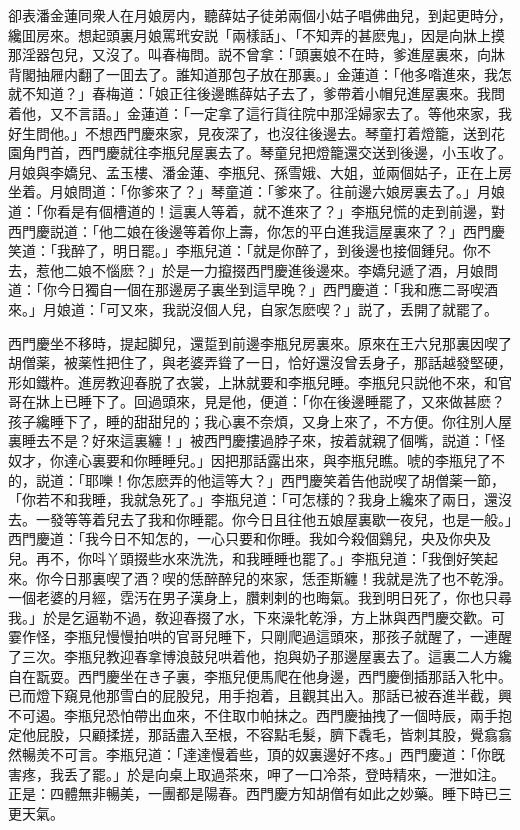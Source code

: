 卻表潘金蓮同衆人在月娘房内，聽薛姑子徒弟兩個小姑子唱佛曲兒，到起更時分，纔囬房來。想起頭裏月娘罵玳安説「兩樣話」、「不知弄的甚麽鬼」，因是向牀上摸那淫器包兒，又沒了。叫春梅問。説不曾拿：「頭裏娘不在時，爹進屋裏來，向牀背閣抽屜内翻了一囬去了。誰知道那包子放在那裏。」金蓮道：「他多喒進來，我怎就不知道？」春梅道：「娘正往後邊瞧薛姑子去了，爹帶着小帽兒進屋裏來。我問着他，又不言語。」金蓮道：「一定拿了這行貨往院中那淫婦家去了。等他來家，我好生問他。」不想西門慶來家，見夜深了，也沒往後邊去。琴童打着燈籠，送到花園角門首，西門慶就往李瓶兒屋裏去了。琴童兒把燈籠還交送到後邊，小玉收了。月娘與李嬌兒、孟玉樓、潘金蓮、李瓶兒、孫雪娥、大姐，並兩個姑子，正在上房坐着。月娘問道：「你爹來了？」琴童道：「爹來了。往前邊六娘房裏去了。」月娘道：「你看是有個槽道的！這裏人等着，就不進來了？」李瓶兒慌的走到前邊，對西門慶説道：「他二娘在後邊等着你上壽，你怎的平白進我這屋裏來了？」西門慶笑道：「我醉了，明日罷。」李瓶兒道：「就是你醉了，到後邊也接個鍾兒。你不去，惹他二娘不惱麽？」於是一力攛掇西門慶進後邊來。李嬌兒遞了酒，月娘問道：「你今日獨自一個在那邊房子裏坐到這早晚？」西門慶道：「我和應二哥喫酒來。」月娘道：「可又來，我説沒個人兒，自家怎麽喫？」説了，丢開了就罷了。

西門慶坐不移時，提起脚兒，還踅到前邊李瓶兒房裏來。原來在王六兒那裏因喫了胡僧薬，被薬性把住了，與老婆弄聳了一日，恰好還沒曾丢身子，那話越發堅硬，形如鐵杵。進房教迎春脱了衣裳，上牀就要和李瓶兒睡。李瓶兒只説他不來，和官哥在牀上已睡下了。回過頭來，見是他，便道：「你在後邊睡罷了，又來做甚麽？孩子纔睡下了，睡的甜甜兒的；我心裏不奈煩，又身上來了，不方便。你往別人屋裏睡去不是？好來這裏纏！」被西門慶摟過脖子來，按着就親了個嘴，説道：「怪奴才，你達心裏要和你睡睡兒。」因把那話露出來，與李瓶兒瞧。唬的李瓶兒了不的，説道：「耶嚛！你怎麽弄的他這等大？」西門慶笑着告他説喫了胡僧薬一節，「你若不和我睡，我就急死了。」李瓶兒道：「可怎樣的？我身上纔來了兩日，還沒去。一發等等着兒去了我和你睡罷。你今日且往他五娘屋裏歇一夜兒，也是一般。」西門慶道：「我今日不知怎的，一心只要和你睡。我如今殺個鷄兒，央及你央及兒。再不，你呌丫頭掇些水來洗洗，和我睡睡也罷了。」李瓶兒道：「我倒好笑起來。你今日那裏喫了酒？喫的恁醉醉兒的來家，恁歪斯纏！我就是洗了也不乾淨。一個老婆的月經，霑汚在男子漢身上，臢剌剌的也晦氣。我到明日死了，你也只尋我。」於是乞逼勒不過，敎迎春掇了水，下來澡牝乾淨，方上牀與西門慶交歡。可霎作怪，李瓶兒慢慢拍哄的官哥兒睡下，只剛爬過這頭來，那孩子就醒了，一連醒了三次。李瓶兒教迎春拿博浪鼓兒哄着他，抱與奶子那邊屋裏去了。這裏二人方纔自在翫耍。西門慶坐在き子裏，李瓶兒便馬爬在他身邊，西門慶倒插那話入牝中。已而燈下窺見他那雪白的屁股兒，用手抱着，且觀其出入。那話已被吞進半截，興不可遏。李瓶兒恐怕帶出血來，不住取巾帕抹之。西門慶抽拽了一個時辰，兩手抱定他屁股，只顧揉搓，那話盡入至根，不容點毛髮，臍下毳毛，皆刺其股，覺翕翕然暢羙不可言。李瓶兒道：「達達慢着些，頂的奴裏邊好不疼。」西門慶道：「你旣害疼，我丢了罷。」於是向桌上取過茶來，呷了一口冷茶，登時精來，一泄如注。正是：四體無非暢美，一團都是陽春。西門慶方知胡僧有如此之妙藥。睡下時已三更天氣。

